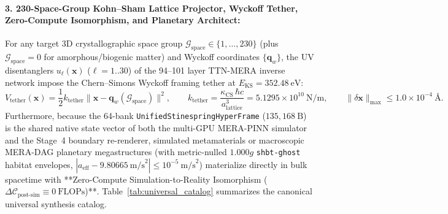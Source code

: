 \documentclass[11pt,onecolumn]{article}
\begin{document}
\paragraph{3. 230-Space-Group Kohn--Sham Lattice Projector, Wyckoff Tether, Zero-Compute Isomorphism, and Planetary Architect:}
For any target 3D crystallographic space group $\mathcal{G}_{\text{space}} \in \{1, \dots, 230\}$ (plus $\mathcal{G}_{\text{space}} = 0$ for amorphous/biogenic matter) and Wyckoff coordinates $\{\mathbf{q}_w\}$, the UV disentanglers $u_\ell(\mathbf{x})$ ($\ell = 1..30$) of the 94--101 layer TTN-MERA inverse network impose the Chern--Simons Wyckoff framing tether at $E_{\text{KS}} = 352.48~\text{eV}$:
\begin{equation}
V_{\text{tether}}(\mathbf{x}) = \frac{1}{2} k_{\text{tether}} \|\mathbf{x} - \mathbf{q}_w(\mathcal{G}_{\text{space}})\|^2, \qquad k_{\text{tether}} = \frac{\kappa_{\text{CS}}\,\hbar c}{a_{\text{lattice}}^3} = 5.1295\times 10^{10}~\text{N/m}, \qquad \|\delta\mathbf{x}\|_{\max} \le 1.0\times 10^{-4}~\text{\AA}.
\label{eq:wyckoff_tether}
\end{equation}
Furthermore, because the 64-bank \texttt{UnifiedStinespringHyperFrame} ($135{,}168~\text{B}$) is the shared native state vector of both the multi-GPU MERA-PINN simulator and the Stage~4 boundary re-renderer, simulated metamaterials or macroscopic MERA-DAG planetary megastructures (with metric-nulled $1.000g$ \texttt{shbt-ghost} habitat envelopes, $|a_{\text{eff}} - 9.80665~\text{m/s}^2| \le 10^{-5}~\text{m/s}^2$) materialize directly in bulk spacetime with **Zero-Compute Simulation-to-Reality Isomorphism ($\Delta\mathcal{C}_{\text{post-sim}} \equiv 0~\text{FLOPs}$)**. Table~\ref{tab:universal_catalog} summarizes the canonical universal synthesis catalog.
\end{document}
